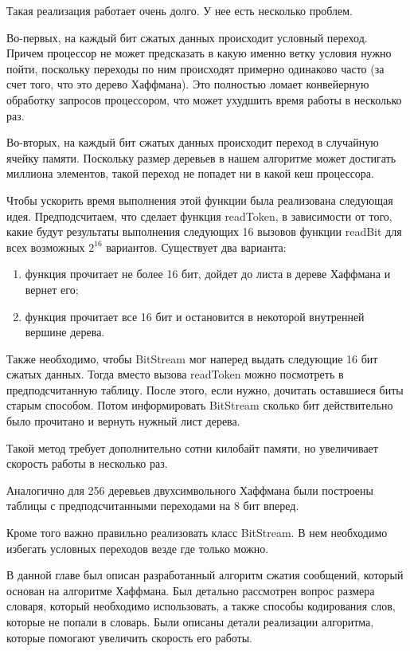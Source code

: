 Такая реализация работает очень долго. У нее есть несколько проблем. 

Во-первых, на каждый бит сжатых данных происходит условный переход. 
Причем процессор не может предсказать в какую именно ветку условия нужно пойти, поскольку переходы по ним происходят примерно одинаково часто 
(за счет того, что это дерево Хаффмана). Это полностью ломает конвейерную обработку запросов процессором, что может ухудшить время работы в
несколько раз.

Во-вторых, на каждый бит сжатых данных происходит переход в случайную ячейку памяти. Поскольку размер деревьев в нашем алгоритме может 
достигать миллиона элементов, такой переход не попадет ни в какой кеш процессора.

Чтобы ускорить время выполнения этой функции была реализована следующая идея. Предподсчитаем, что сделает функция readToken, в зависимости
от того, какие будут результаты выполнения следующих 16 вызовов функции readBit для всех возможных $2^{16}$ вариантов. Существует два варианта:
\begin{enumerate}
	\item функция прочитает не более 16 бит, дойдет до листа в дереве Хаффмана и вернет его;
	\item функция прочитает все 16 бит и остановится в некоторой внутренней вершине дерева.
\end{enumerate}

Также необходимо, чтобы BitStream мог наперед выдать следующие 16 бит сжатых данных. Тогда вместо вызова readToken можно посмотреть в
предподсчитанную таблицу. После этого, если нужно, дочитать оставшиеся биты старым способом. Потом информировать BitStream 
сколько бит действительно было прочитано и вернуть нужный лист дерева.

Такой метод требует дополнительно сотни килобайт памяти, но увеличивает скорость работы в несколько раз.

Аналогично для 256 деревьев двухсимвольного Хаффмана были построены таблицы с предподсчитанными переходами на 8 бит вперед.

Кроме того важно правильно реализовать класс BitStream. В нем необходимо избегать условных переходов везде где только можно.

\chapterconclusion

В данной главе был описан разработанный алгоритм сжатия сообщений, который основан на алгоритме Хаффмана. Был детально рассмотрен вопрос размера словаря,
который необходимо использовать, а также способы кодирования слов, которые не попали в словарь. Были описаны детали реализации алгоритма, 
которые помогают увеличить скорость его работы.